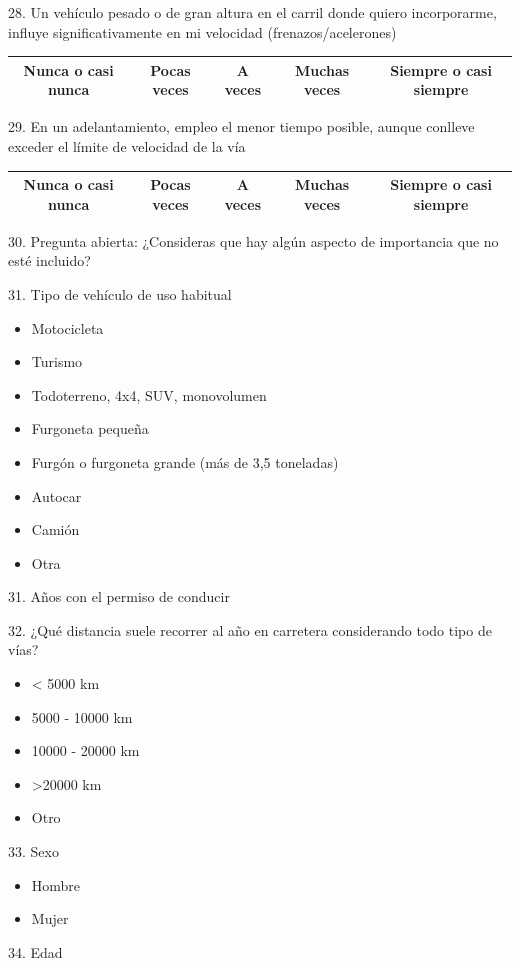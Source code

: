 28.  Un vehículo pesado o de gran altura en el carril donde quiero incorporarme, influye significativamente en mi velocidad (frenazos/acelerones)
\vspace{-10pt}
\begin{table}[H]
\centering
\begin{tabular}{|c|c|c|c|c|}
\hline
Nunca o casi nunca & Pocas veces & A veces & Muchas veces & Siempre o casi siempre \\ \hline
\end{tabular}
\end{table}

29.  En un adelantamiento, empleo el menor tiempo posible, aunque conlleve exceder el límite de velocidad de la vía
\vspace{-10pt}
\begin{table}[h]
\centering
\begin{tabular}{|c|c|c|c|c|}
\hline
Nunca o casi nunca & Pocas veces & A veces & Muchas veces & Siempre o casi siempre \\ \hline
\end{tabular}
\end{table}

30.  Pregunta abierta:
¿Consideras que hay algún aspecto de importancia que no esté incluido?
   \vspace{10pt}

31. Tipo de vehículo de uso habitual
   \begin{itemize}
        \item Motocicleta
        \item Turismo
        \item Todoterreno, 4x4, SUV, monovolumen
        \item Furgoneta pequeña
        \item Furgón o furgoneta grande (más de 3,5 toneladas)
        \item Autocar
        \item Camión
        \item Otra
   \end{itemize}
   
31. Años con el permiso de conducir
   \vspace{10pt}
   
32. ¿Qué distancia suele recorrer al año en carretera considerando todo tipo de vías? 
   \begin{itemize}
        \item < 5000 km
        \item 5000 - 10000 km
        \item 10000 - 20000 km
        \item >20000 km
        \item Otro
   \end{itemize}
   \vspace{10pt}
   
33. Sexo
   \begin{itemize}
        \item Hombre
        \item Mujer
   \end{itemize}
   \vspace{10pt}
   
34. Edad
   \vspace{10pt}
